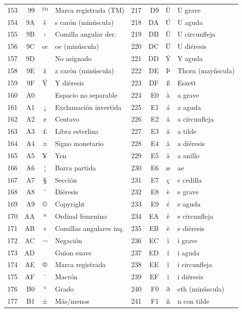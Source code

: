 \documentclass[12pt,twoside]{book}
\begin{document}
\begin{longtable}{r r c l r r c l}
						153 & 99 & ™ & Marca registrada (TM) & 217 & D9 & Ù & U grave \\
						154 & 9A & š & s carón (minúscula) & 218 & DA & Ú & U aguda \\
						155 & 9B & › & Comilla angular der. & 219 & DB & Û & U circunfleja \\
						156 & 9C & œ & oe (minúscula) & 220 & DC & Ü & U diéresis \\
						157 & 9D &  & No asignado & 221 & DD & Ý & Y aguda \\
						158 & 9E & ž & z carón (minúscula) & 222 & DE & Þ & Thorn (mayúscula) \\
						159 & 9F & Ÿ & Y diéresis & 223 & DF & ß & Eszett \\
						160 & A0 & ~ & Espacio no separable & 224 & E0 & à & a grave \\
						161 & A1 & ¡ & Exclamación invertida & 225 & E1 & á & a aguda \\
						162 & A2 & ¢ & Centavo & 226 & E2 & â & a circunfleja \\
						163 & A3 & £ & Libra esterlina & 227 & E3 & ã & a tilde \\
						164 & A4 & ¤ & Signo monetario & 228 & E4 & ä & a diéresis \\
						165 & A5 & ¥ & Yen & 229 & E5 & å & a anillo \\
						166 & A6 & ¦ & Barra partida & 230 & E6 & æ & ae \\
						167 & A7 & § & Sección & 231 & E7 & ç & c cedilla \\
						168 & A8 & ¨ & Diéresis & 232 & E8 & è & e grave \\
						169 & A9 & © & Copyright & 233 & E9 & é & e aguda \\
						170 & AA & ª & Ordinal femenino & 234 & EA & ê & e circunfleja \\
						171 & AB & « & Comillas angulares izq. & 235 & EB & ë & e diéresis \\
						172 & AC & ¬ & Negación & 236 & EC & ì & i grave \\
						173 & AD & ­ & Guion suave & 237 & ED & í & i aguda \\
						174 & AE & ® & Marca registrada & 238 & EE & î & i circunfleja \\
						175 & AF & ¯ & Macrón & 239 & EF & ï & i diéresis \\
						176 & B0 & ° & Grado & 240 & F0 & ð & eth (minúscula) \\
						177 & B1 & ± & Más/menos & 241 & F1 & ñ & n con tilde \\

\end{longtable}
\end{document}
